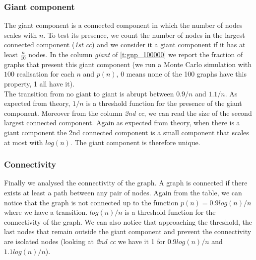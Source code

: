 \subsubsection{Giant component}

The giant component is a connected component in which the number of nodes scales with $n$. To test its presence, we count the number of nodes in the largest connected component (\textit{1st cc}) and we consider it a giant component if it has at least $\frac{n}{10}$ nodes. In the column \textit{giant} of \cref{t:gnp_100000} we report the fraction of graphs that present this giant component (we run a Monte Carlo simulation with $100$ realisation for each $n$ and $p(n)$, 0 means none of the 100 graphs have this property, 1 all have it). \\
The transition from no giant to giant is abrupt between $0.9/n$ and $1.1/n$. As expected from theory, $1/n$ is a threshold function for the presence of the giant component. Moreover from the column \textit{2nd cc}, we can read the size of the second largest connected component. Again as expected from theory, when there is a giant component the 2nd connected component is a small component that scales at most with $log(n)$. The giant component is therefore unique.

\subsubsection{Connectivity}
Finally we analysed the connectivity of the graph. A graph is connected if there exists at least a path between any pair of nodes. Again from the table, we can notice that the graph is not connected up to the function $p(n)=0.9log(n)/n$ where we have a transition. $log(n)/n$ is a threshold function for the connectivity of the graph. We can also notice that approaching the threshold, the last nodes that remain outside the giant component and prevent the connectivity are isolated nodes (looking at \textit{2nd cc} we have it 1 for $0.9log(n)/n$ and $1.1 log(n)/n$).

